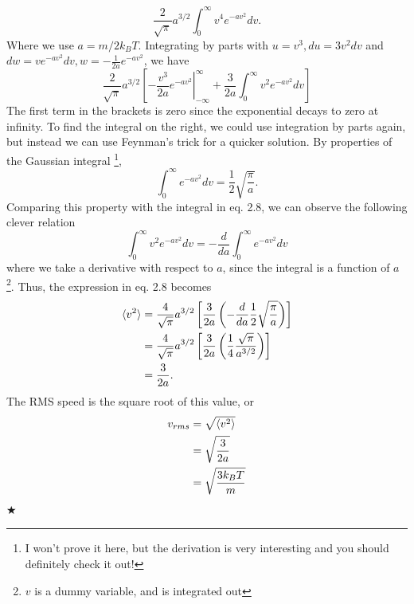 \begin{equation}
    \frac{2}{\sqrt{\pi}} a^{3/2}\int_{0}^\infty v^4e^{-av^2}dv.\nonumber
\end{equation}
\noindent Where we use $a=m/2k_BT$. Integrating by parts with $u=v^3,du = 3v^2dv$ and $dw = ve^{-av^2}dv, w=-\frac{1}{2a}e^{-av^2}$, we have
\begin{equation}
    \frac{2}{\sqrt{\pi}} a^{3/2}\left[\left.-\frac{v^3}{2a}e^{-av^2}\right|_{-\infty}^\infty + \frac{3}{2a}\int_{0}^\infty v^2e^{-av^2}dv\right]
\end{equation}
\noindent The first term in the brackets is zero since the exponential decays to zero at infinity. To find the integral on the right, we could use integration by parts again, but instead we can use Feynman's trick for a quicker solution. By properties of the Gaussian integral \footnote{I won't prove it here, but the derivation is very interesting and you should definitely check it out!},
\begin{equation*}
    \int_{0}^\infty e^{-av^2}dv =\frac12 \sqrt{\frac{\pi}{a}}.
\end{equation*}
\noindent Comparing this property with the integral in eq. 2.8, we can observe the following clever relation
\begin{equation*}
    \int_{0}^\infty v^2e^{-av^2}dv = -\frac{d}{da}\int_{0}^\infty e^{-av^2}dv
\end{equation*}
\noindent where we take a derivative with respect to $a$, since the integral is a function of $a$ \footnote{$v$ is a dummy variable, and is integrated out}. Thus, the expression in eq. 2.8 becomes
\begin{align}
    \langle v^2\rangle &= \frac{4}{\sqrt{\pi}} a^{3/2}\left[\frac{3}{2a}\left(-\frac{d}{da} \frac12\sqrt{\frac{\pi}{a}}\right)\right] \nonumber \\
    &= \frac{4}{\sqrt{\pi}} a^{3/2}\left[\frac{3}{2a}\left(\frac14\frac{\sqrt{\pi}}{a^{3/2}}\right)\right] \nonumber \\
    &= \frac{3}{2a}.
\end{align}
\noindent The RMS speed is the square root of this value, or
\begin{align}
    v_{rms} &= \sqrt{\langle v^2\rangle} \nonumber \\
    &= \sqrt{\frac{3}{2a}} \nonumber \\
    &= \sqrt{\frac{3k_BT}{m}}
\end{align}
$\bigstar$

%
%

